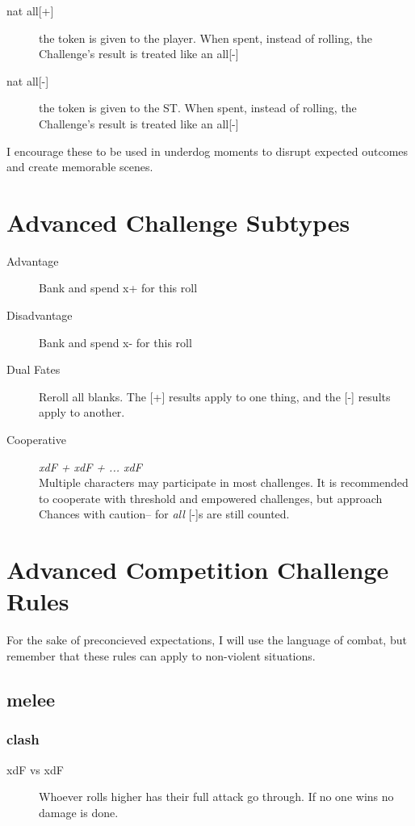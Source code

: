 \documentclass[statementpaper,oneside,article,12pt]{memoir}
\begin{document}
	\begin{description}
		\item[nat all{[+]}] the token is given to the player. When spent, instead of rolling, the Challenge's result is treated like an all[-] 
		\item[nat all{[-]}] the token is given to the ST. When spent, instead of rolling, the Challenge's result is treated like an all[-] 
	\end{description}
	
	I encourage these to be used in underdog moments to disrupt expected outcomes and create memorable scenes.
	
	
	\section*{Advanced Challenge Subtypes}
	
	\begin{description}
		\item[Advantage] Bank and spend x+ for this roll
		\item[Disadvantage] Bank and spend x- for this roll
		\item[Dual Fates] Reroll all blanks. The [+] results apply to one thing, and the [-] results apply to another.
		\item[Cooperative] \textit{xdF + xdF + ... xdF}\\Multiple characters may participate in most challenges. It is recommended to cooperate with threshold and empowered challenges, but approach Chances with caution-- for \textit{all} [-]s are still counted.
	\end{description}
		
		
	\section{Advanced Competition Challenge Rules}
	For the sake of preconcieved expectations, I will use the language of combat, but remember that these rules can apply to non-violent situations.
	\subsection{melee}
	\subsubsection{clash}
	\begin{description}
		\item[xdF vs xdF] 
		  Whoever rolls higher has their full attack go through. If no one wins no damage is done. 
	\end{description}
\end{document}
